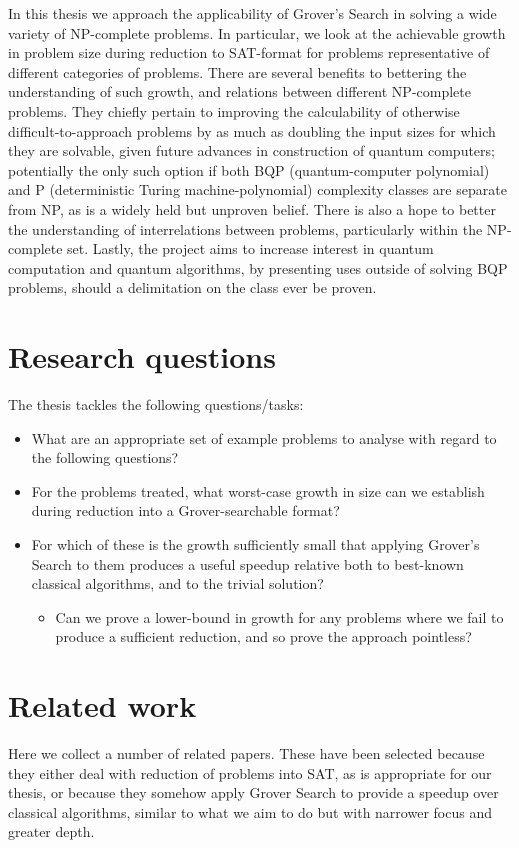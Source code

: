 \documentclass[msc,lith,english]{liuthesis}
\begin{document}
In this thesis we approach the applicability of Grover's Search in solving a wide variety of NP-complete problems. In particular, we look at the achievable growth in problem size during reduction to SAT-format for problems representative of different categories of problems. There are several benefits to bettering the understanding of such growth, and relations between different NP-complete problems. They chiefly pertain to improving the calculability of otherwise difficult-to-approach problems by as much as doubling the input sizes for which they are solvable, given future advances in construction of quantum computers; potentially the only such option if both BQP (quantum-computer polynomial) and P (deterministic Turing machine-polynomial) complexity classes are separate from NP, as is a widely held but unproven belief. There is also a hope to better the understanding of interrelations between problems, particularly within the NP-complete set. Lastly, the project aims to increase interest in quantum computation and quantum algorithms, by presenting uses outside of solving BQP problems, should a delimitation on the class ever be proven.

\section{Research questions}
The thesis tackles the following questions/tasks:
\begin{itemize}
    \item What are an appropriate set of example problems to analyse with regard to the following questions?
    \item For the problems treated, what worst-case growth in size can we establish during reduction into a Grover-searchable format?
    \item For which of these is the growth sufficiently small that applying Grover's Search to them produces a useful speedup relative both to best-known classical algorithms, and to the trivial solution?
    \begin{itemize}
        \item Can we prove a lower-bound in growth for any problems where we fail to produce a sufficient reduction, and so prove the approach pointless?
    \end{itemize}
\end{itemize}

\section{Related work}
Here we collect a number of related papers. These have been selected because they either deal with reduction of problems into SAT, as is appropriate for our thesis, or because they somehow apply Grover Search to provide a speedup over classical algorithms, similar to what we aim to do but with narrower focus and greater depth.
\end{document}
